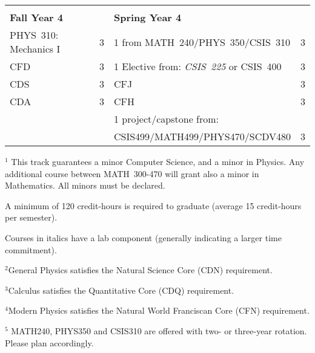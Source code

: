 \documentclass[12pt]{article}
\begin{document}
\begin{table}[h!]
\begin{center}
{\begin{tabular*}{0.9\textwidth}{@{\extracolsep{\fill}}lclc}
 & \\
 
{\Large \textbf{Fall Year 4}} & & {\Large \textbf{Spring Year 4}} & \\
\hline
PHYS~310: Mechanics I & 3 & 1 from MATH~240/PHYS~350/CSIS~310 					& 3 \\
CFD					& 3 & 1 Elective from: {\em CSIS~225} or CSIS~400			& 3 \\
CDS  						& 3 & CFJ    			& 3 \\
CDA                    				& 3  & CFH              							& 3 \\
                        				&  &   1 project/capstone from:              							&  \\
      & & CSIS499/MATH499/PHYS470/SCDV480  &3\\
      
\hline
\end{tabular*}
}
\end{center}
\end{table}

\hspace{0.1in}$^{1}$ This track guarantees a minor  Computer Science, and a minor in Physics. Any additional course between MATH~300-470 will grant also a minor in Mathematics. All minors  must be declared.

\hspace*{0.1in} A minimum of 120 credit-hours is required to graduate (average 15 credit-hours per semester).

\hspace*{0.1in}Courses in italics have a lab
component (generally indicating a larger time commitment). 

\hspace{0.1in}$^{2}$General Physics satisfies the Natural Science Core (CDN) requirement.

\hspace{0.1in}$^{3}$Calculus satisfies the Quantitative Core (CDQ) requirement.

\hspace{0.1in}$^{4}$Modern Physics satisfies the Natural World Franciscan Core
(CFN) requirement.

\hspace{0.1in}$^{5}$ MATH240, PHYS350 and CSIS310 are offered with two- or three-year rotation. Please plan accordingly.
\newpage
\end{document}
